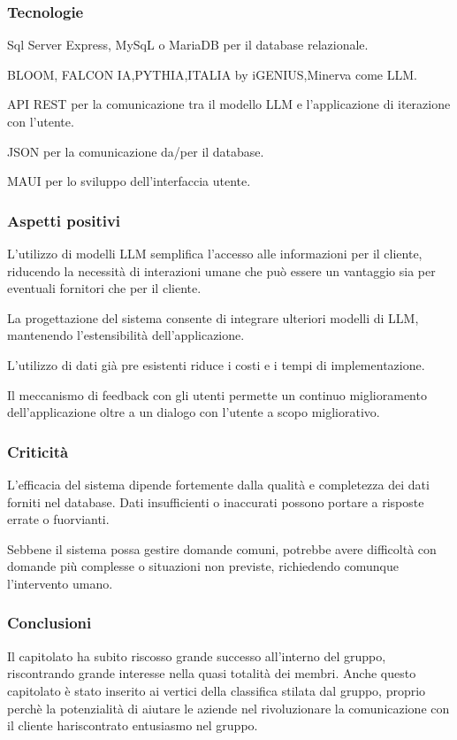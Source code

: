     \subsubsection{Tecnologie}
        \begin{itemsize}
            \item Sql Server Express, MySqL o MariaDB per il database relazionale.
            \item BLOOM, FALCON IA,PYTHIA,ITALIA by iGENIUS,Minerva come LLM.
            \item API REST per la comunicazione tra il modello LLM e l’applicazione di iterazione con l’utente.
            \item JSON per la comunicazione da/per il database.
            \item MAUI per lo sviluppo dell’interfaccia  utente.
        \end{itemsize}
    \subsubsection{Aspetti positivi}
        \begin{itemsize}
            \item L’utilizzo di modelli LLM semplifica l’accesso alle informazioni per il cliente, riducendo la necessità di interazioni umane che può essere un vantaggio sia per eventuali fornitori che per il cliente.
            \item La progettazione del sistema consente di integrare ulteriori modelli di LLM, mantenendo l’estensibilità dell’applicazione.
            \item L’utilizzo di dati già pre esistenti riduce i costi e i tempi di implementazione.
            \item Il meccanismo di feedback con gli utenti permette un continuo miglioramento dell’applicazione oltre a un dialogo con l’utente a scopo migliorativo.
        \end{itemsize}
    \subsubsection{Criticità}
    \begin{itemsize}
            \item L'efficacia del sistema dipende fortemente dalla qualità e completezza dei dati forniti nel database. Dati insufficienti o inaccurati possono portare a risposte errate o fuorvianti.
            \item Sebbene il sistema possa gestire domande comuni, potrebbe avere difficoltà con domande più complesse o situazioni non previste, richiedendo comunque l'intervento umano.
        \end{itemsize}
    \subsubsection{Conclusioni}
    Il capitolato ha subito riscosso grande successo all’interno del gruppo, riscontrando grande interesse nella quasi totalità dei membri.  Anche questo capitolato è stato inserito ai vertici della classifica stilata dal gruppo, proprio perchè la potenzialità di aiutare le aziende nel rivoluzionare la comunicazione con il cliente hariscontrato entusiasmo nel gruppo.
